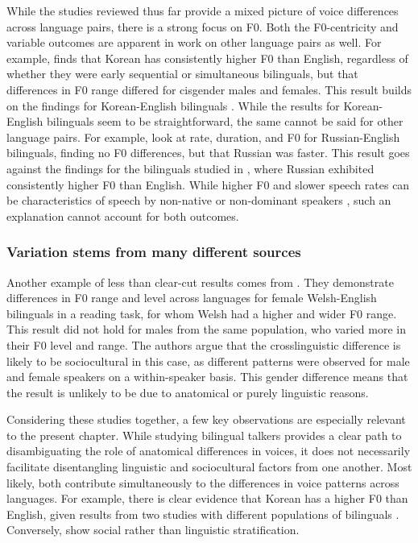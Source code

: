 While the studies reviewed thus far provide a mixed picture of voice differences across language pairs, there is a strong focus on F0. Both the F0-centricity and variable outcomes are apparent in work on other language pairs as well. For example, \citet{cheng_2020_f0} finds that Korean has consistently higher F0 than English, regardless of whether they were early sequential or simultaneous bilinguals, but that differences in F0 range differed for cisgender males and females. This result builds on the findings for Korean-English bilinguals \citep{lee_2017_bilingual}. While the results for Korean-English bilinguals seem to be straightforward, the same cannot be said for other language pairs. For example, \citet{ryabov_2016_self} look at rate, duration, and F0 for Russian-English bilinguals, finding no F0 differences, but that Russian was faster. This result goes against the findings for the bilinguals studied in \citet{altenberg_2006_f0}, where Russian exhibited consistently higher F0 than English. While higher F0 and slower speech rates can be characteristics of speech by non-native or non-dominant speakers \citep{jarvinen_2013_speaking}, such an explanation cannot account for both outcomes. 

\subsubsection{Variation stems from many different sources}

Another example of less than clear-cut results comes from \citet{ordin_2017_cross}. They demonstrate differences in F0 range and level across languages for female Welsh-English bilinguals in a reading task, for whom Welsh had a higher and wider F0 range. This result did not hold for males from the same population, who varied more in their F0 level and range. The authors argue that the crosslinguistic difference is likely to be sociocultural in this case, as different patterns were observed for male and female speakers on a within-speaker basis. This gender difference means that the result is unlikely to be due to anatomical or purely linguistic reasons.

Considering these studies together, a few key observations are especially relevant to the present chapter. While studying bilingual talkers provides a clear path to disambiguating the role of anatomical differences in voices, it does not necessarily facilitate disentangling linguistic and sociocultural factors from one another. Most likely, both contribute simultaneously to the differences in voice patterns across languages. For example, there is clear evidence that Korean has a higher F0 than English, given results from two studies with different populations of bilinguals \cite{cheng_2020_f0,lee_2017_bilingual}. Conversely, \cite{ordin_2017_cross} show social rather than linguistic stratification. 

